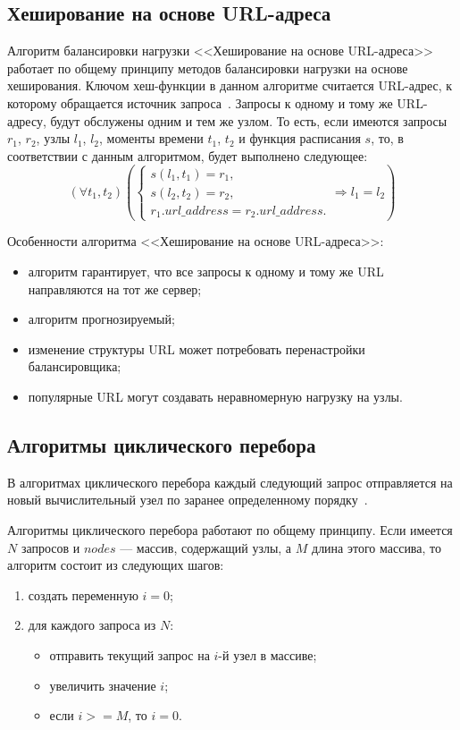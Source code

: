 \subsection*{Хеширование на основе URL-адреса}

Алгоритм балансировки нагрузки <<Хеширование на основе URL-адреса>> работает по общему принципу методов балансировки нагрузки на основе хеширования.
Ключом хеш-функции в данном алгоритме считается URL-адрес, к которому обращается источник запроса~\cite{nginx, kemp, haproxy}.
Запросы к одному и тому же URL-адресу, будут обслужены одним и тем же узлом.
То есть, если имеются запросы $r_1$, $r_2$, узлы $l_1$, $l_2$, моменты времени $t_1$, $t_2$ и функция расписания $s$, то, в соответствии с данным алгоритмом, будет выполнено следующее:
\begin{equation}
	(\forall t_1, t_2) \left(\begin{cases}
		s(l_1, t_1) = r_1, \\
		s(l_2, t_2) = r_2, \\
		r_1.url\_address = r_2.url\_address.
	\end{cases} \Rightarrow l_1 = l_2 \right)
\end{equation}

Особенности алгоритма <<Хеширование на основе URL-адреса>>:
\begin{itemize}
	\item алгоритм гарантирует, что все запросы к одному и тому же URL направляются на тот же сервер;
	\item алгоритм прогнозируемый;
	\item изменение структуры URL может потребовать перенастройки балансировщика;
	\item популярные URL могут создавать неравномерную нагрузку на узлы.
\end{itemize}

\subsection{Алгоритмы циклического перебора}

В алгоритмах циклического перебора каждый следующий запрос отправляется на новый вычислительный узел по заранее определенному порядку~\cite{comp}.

Алгоритмы циклического перебора работают по общему принципу.
Если имеется $N$ запросов и $nodes$ --- массив, содержащий узлы, а $M$ длина этого массива, то алгоритм состоит из следующих шагов:
\begin{enumerate}
	\item создать переменную $i = 0$;
	\item для каждого запроса из $N$:
	\begin{itemize}
		\item отправить текущий запрос на $i$-й узел в массиве;
		\item увеличить значение $i$;
		\item если $i >= M$, то $i = 0$.
	\end{itemize}	
\end{enumerate}

